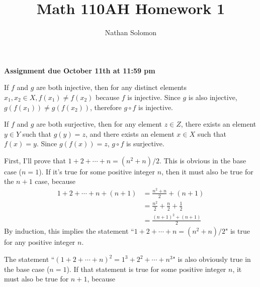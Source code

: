 \documentclass[12pt]{article}
\begin{document}
\title{Math 110AH Homework 1}
\author{Nathan Solomon}
\maketitle

\textbf{Assignment due October 11th at 11:59 pm}

\bigskip
\noindent{}\bigskip

If $f$ and $g$ are both injective, then for any distinct elements $x_1, x_2 \in X, f(x_1) \neq f(x_2)$ because $f$ is injective. Since $g$ is also injective, $g(f(x_1)) \neq g(f(x_2))$, therefore $g \circ f$ is injective.
\par
If $f$ and $g$ are both surjective, then for any element $z \in Z$, there exists an element $y \in Y$ such that $g(y) = z$, and there exists an element $x \in X$ such that $f(x) = y$. Since $g(f(x)) = z$, $g \circ f$ is surjective.

\bigskip
\noindent{}\bigskip

First, I'll prove that $1 + 2 + \cdots + n = (n^2 + n) / 2$. This is obvious in the base case ($n=1$). If it's true for some positive integer $n$, then it must also be true for the $n+1$ case, because
\begin{align*}
    1 + 2 + \cdots + n + (n + 1) &= \frac{n^2 + n}{2} + (n + 1) \\
                                 &= \frac{n^2}{2} + \frac{n}{2} + \frac{1}{2}  \\
                                 &= \frac{(n + 1)^2 + (n + 1)}{2}
\end{align*}
By induction, this implies the statement ``$1 + 2 + \cdots + n = (n^2 + n) / 2$" is true for any positive integer $n$.
\par
The statement ``$(1 + 2 + \cdots + n)^2 = 1^3 + 2^2 + \cdots + n^3$" is also obviously true in the base case ($n=1$). If that statement is true for some positive integer $n$, it must also be true for $n+1$, because
\end{document}
